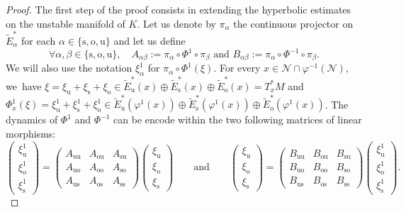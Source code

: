 \documentclass[11pt]{article}
\newcommand{\ro}{\mathrm{o}}
\newcommand{\rs}{\mathrm{s}}
\newcommand{\rso}{\mathrm{so}}
\newcommand{\ru}{\mathrm{u}}
\newcommand{\ruo}{\mathrm{uo}}
\theoremstyle{definition}
\theoremstyle{plain}
\newcommand{\Ncal}{\mathcal{N}}
\begin{document}
\begin{proof}
The first step of the proof consists in extending the hyperbolic estimates on the unstable manifold of $K$. Let us denote by $\pi_{\alpha}$ the continuous projector on $\widetilde{E}_{\alpha}^*$ for each $\alpha \in \{\rs,\ro,\ru\}$ and let us define
\[
\forall \alpha, \beta \in \{\rs,\ro,\ru\}, \quad A_{\alpha \beta}:= \pi_{\alpha} \circ \Phi^1 \circ \pi_{\beta} \text{ and } B_{\alpha \beta}:= \pi_{\alpha} \circ \Phi^{-1} \circ \pi_{\beta}.
\]
We will also use the notation $\xi_{\alpha}^1$ for $\pi_{\alpha} \circ \Phi^1 (\xi)$. For every $x \in \Ncal \cap \varphi^{-1}(\Ncal) $, we~have $\xi = \xi_\ru + \xi_\rs + \xi_\ro \in \widetilde{E}_\ru^* (x) \oplus \widetilde{E}_\rs^* (x) \oplus \widetilde{E}_\ro^* (x) = T_x^* M$ and $\Phi_x^1 (\xi) = \xi_\ru^1 + \xi_\rs^1 + \xi_\ro^1 \in \widetilde{E}_\ru^* (\varphi^1 (x)) \oplus \widetilde{E}_\rs^* (\varphi^1 (x)) \oplus \widetilde{E}_\ro^* (\varphi^1 (x))$. The dynamics of $\Phi^1$ and $\Phi^{-1}$ can be encode within the two following matrices of linear morphisms:
\[
\begin{pmatrix}\xi_\ru^1 \\ \xi_\ro^1 \\ \xi_\rs^1 \end{pmatrix}
= \begin{pmatrix}
A_{\ru\ru} & A_{\ro\ru} & A_{\rs\ru} \\
A_{\ruo} & A_{\ro\ro} & A_{\rso} \\
A_{\ru\rs} & A_{\ro\rs} & A_{\rs\rs}
\end{pmatrix}
\begin{pmatrix}\xi_\ru \\ \xi_\ro \\ \xi_\rs \end{pmatrix}
\qquad \text{and} \qquad \begin{pmatrix}\xi_\ru \\ \xi_\ro \\ \xi_\rs \end{pmatrix}
= \begin{pmatrix}
B_{\ru\ru} & B_{\ro\ru} & B_{\rs\ru} \\
B_{\ruo} & B_{\ro\ro} & B_{\rso} \\
B_{\ru\rs} & B_{\ro\rs} & B_{\rs\rs}
\end{pmatrix}
\begin{pmatrix}\xi_\ru^1 \\ \xi_\ro^1 \\ \xi_\rs^1 \end{pmatrix}.
\]
\end{proof}
\end{document}
